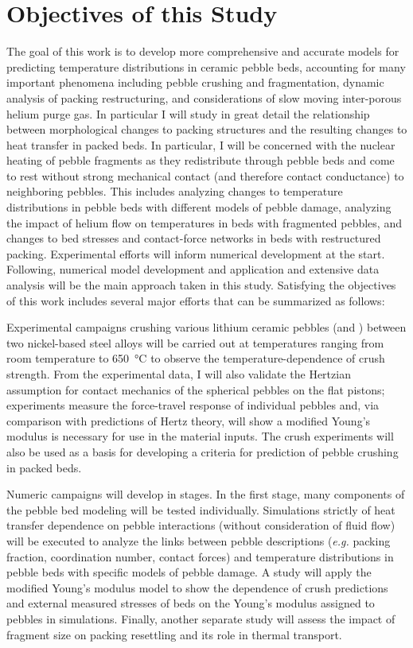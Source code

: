 \section{Objectives of this Study}\label{sec:intro-scope-of-work}
The goal of this work is to develop more comprehensive and accurate models for predicting temperature distributions in ceramic pebble beds, accounting for many important phenomena including pebble crushing and fragmentation, dynamic analysis of packing restructuring, and considerations of slow moving inter-porous helium purge gas. In particular I will study in great detail the relationship between morphological changes to packing structures and the resulting changes to heat transfer in packed beds. In particular, I will be concerned with the nuclear heating of pebble fragments as they redistribute through pebble beds and come to rest without strong mechanical contact (and therefore contact conductance) to neighboring pebbles. This includes analyzing changes to temperature distributions in pebble beds with different models of pebble damage, analyzing the impact of helium flow on temperatures in beds with fragmented pebbles, and changes to bed stresses and contact-force networks in beds with restructured packing. Experimental efforts will inform numerical development at the start. Following, numerical model development and application and extensive data analysis will be the main approach taken in this study. Satisfying the objectives of this work includes several major efforts that can be summarized as follows:

Experimental campaigns crushing various lithium ceramic pebbles (\lit and \lis) between two nickel-based steel alloys will be carried out at temperatures ranging from room temperature to \SI{650}{\celsius} to observe the temperature-dependence of crush strength. From the experimental data, I will also validate the Hertzian assumption for contact mechanics of the spherical pebbles on the flat pistons; experiments measure the force-travel response of individual pebbles and, via comparison with predictions of Hertz theory, will show a modified Young's modulus is necessary for use in the material inputs. The crush experiments will also be used as a basis for developing a criteria for prediction of pebble crushing in packed beds. 

Numeric campaigns will develop in stages. In the first stage, many components of the pebble bed modeling will be tested individually. Simulations strictly of heat transfer dependence on pebble interactions (without consideration of fluid flow) will be executed to analyze the links between pebble descriptions (\textit{e.g.} packing fraction, coordination number, contact forces) and temperature distributions in pebble beds with specific models of pebble damage. A study will apply the modified Young's modulus model to show the dependence of crush predictions and external measured stresses of beds on the Young's modulus assigned to pebbles in simulations. Finally, another separate study will assess the impact of fragment size on packing resettling and its role in thermal transport.

